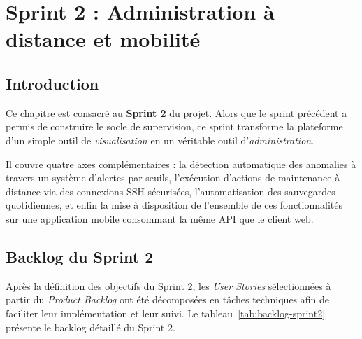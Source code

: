 \thispagestyle{fancy}

\chapter{Sprint 2 : Administration à distance et mobilité}

\section*{Introduction}
Ce chapitre est consacré au \textbf{Sprint 2} du projet. Alors que le sprint précédent a
permis de construire le socle de supervision, ce sprint transforme la plateforme d'un
simple outil de \emph{visualisation} en un véritable outil d'\emph{administration}.

Il couvre quatre axes complémentaires : la détection automatique des anomalies à travers
un système d'alertes par seuils, l'exécution d'actions de maintenance à distance via des
connexions SSH sécurisées, l'automatisation des sauvegardes quotidiennes, et enfin la
mise à disposition de l'ensemble de ces fonctionnalités sur une application mobile
consommant la même API que le client web.

\section{Backlog du Sprint 2}
Après la définition des objectifs du Sprint 2, les \textit{User Stories} sélectionnées à
partir du \textit{Product Backlog} ont été décomposées en tâches techniques afin de
faciliter leur implémentation et leur suivi. Le tableau~\ref{tab:backlog-sprint2}
présente le backlog détaillé du Sprint 2.

